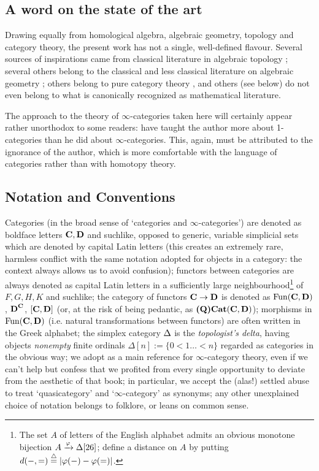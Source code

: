 \subsection*{A word on the state of the art}
Drawing equally from homological algebra, algebraic geometry, topology and category theory, the present work has not a single, well\hyp{}defined flavour. Several sources of inspirations came from classical literature in algebraic topology \cite{HPS,tierney1969categorical,shc}; several others belong to the classical and less classical literature on algebraic geometry \cite{VerdierDesDes,Brid,Bridge2,Bondal1995}; others belong to pure category theory \cite{RT, CHK,JanelidzeMarkl,Korostenski199357,Lucyshyn-Wright,zangurashvili2004several}, and others (see below) do not even belong to what is canonically recognized as mathematical literature.

The approach to the theory of $\infty$\hyp{}categories taken here will certainly appear rather unorthodox to some readers: \cite{HTT,LurieHA} have taught the author more about 1\hyp{}categories than he did about $\infty$\hyp{}categories. This, again, must be attributed to the ignorance of the author, which is more comfortable with the language of categories rather than with homotopy theory.
\subsection*{Notation and Conventions}
Categories (in the broad sense of `categories and $\infty$\hyp{}categories') are denoted as boldface letters $\textbf{C},\textbf{D}$ and suchlike, opposed to generic, variable simplicial sets which are denoted by capital Latin letters (this creates an extremely rare, harmless conflict with the same notation adopted for objects in a category: the context always allows us to avoid confusion); functors between categories are always denoted as capital Latin letters in a sufficiently large neighbourhood\footnote{The set $A$ of letters of the English alphabet admits an obvious monotone bijection $A\xrightarrow{\varphi}\Delta[26]$; define a distance on $A$ by putting $d(-,=) \overset{\triangle}{=} |\varphi(-) - \varphi(=)|$.} of $F,G,H,K$ and suchlike; the category of functors $\textbf{C}\to \textbf{D}$ is denoted as $\text{Fun}(\textbf{C},\textbf{D})$, $\textbf{D}^{\textbf{C}}$, $[\textbf{C},\textbf{D}]$ (or, at the risk of being pedantic, as $\textbf{(Q)Cat}(\textbf{C}, \textbf{D})$); morphisms in $\text{Fun}(\textbf{C},\textbf{D})$ (i.e. natural transformations between functors) are often written in the Greek alphabet; the simplex category $\Delta$ is the \emph{topologist's delta}, having objects \emph{nonempty} finite ordinals $\Delta[n]:=\{0<1\dots<n\}$ regarded as categories in the obvious way; we adopt \cite{HTT} as a main reference for $\infty$\hyp{}category theory, even if we can't help but confess that we profited from every single opportunity to deviate from the aesthetic of that book; in particular, we accept the (alas!) settled abuse to treat `quasicategory' and `$\infty$\hyp{}category' as synonyms; any other unexplained choice of notation belongs to folklore, or leans on common sense.

